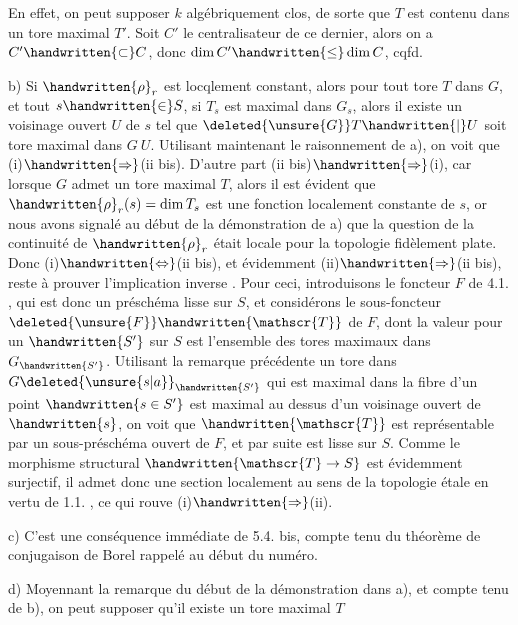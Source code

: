 En effet, on peut supposer $k$ algébriquement clos, de sorte que $T$ est contenu dans un tore maximal  $T'$. Soit $C'$ le centralisateur de ce dernier, alors on a $C'\handwritten{\subset}C$, donc $\dim C'\handwritten{\leq}\dim C$, cqfd.

b)  Si $\handwritten{\rho}_{r}$ est locqlement constant, alors pour tout tore $T$ dans $G$,  et tout $s\handwritten{\in}S$, si $T_{s}$ est  maximal dans $G_{s}$, alors il existe un voisinage ouvert $U$ de $s$ tel que $\deleted{\unsure{G}}T\handwritten{\vert}U$ soit tore maximal dans $G\ U$. Utilisant maintenant le raisonnement de a), on voit que  (i)$\handwritten{\Rightarrow}$(ii bis). D'autre part (ii bis)$\handwritten{\Rightarrow}$(i),
car  lorsque $G$ admet un tore maximal $T$, alors il est évident que $\handwritten{\rho}_{r}(s)=\dim T_{s}$ est une fonction localement constante de  $s$, or nous avons signalé au début de la démonstration de a) que la question de la continuité de $\handwritten{\rho}_{r}$ était locale pour la topologie fidèlement plate. Donc (i)$\handwritten{\Leftrightarrow}$(ii bis), et évidemment (ii)$\handwritten{\Rightarrow}$(ii bis), reste à prouver l'implication inverse .
Pour ceci, introduisons le foncteur $F$ de 4.1. , qui est donc un préschéma  lisse  sur $S$, et considérons le sous-foncteur $\deleted{\unsure{F}}\handwritten{\mathscr{T}}$ de $F$, dont la valeur  pour un $\handwritten{S'}$ sur $S$ est l'ensemble des tores maximaux dans $G_{\handwritten{S'}}$. Utilisant la remarque précédente   un tore dans ${G\deleted{\unsure{s|a}}}_{\handwritten{S'}}$ qui est maximal dans la fibre d'un
point $\handwritten{s\in S'}$ est maximal au dessus d'un voisinage ouvert de $\handwritten{s}$, on voit que $\handwritten{\mathscr{T}}$ est représentable par un sous-préschéma ouvert de $F$, et par suite est lisse  sur $S$. Comme le morphisme structural $\handwritten{\mathscr{T}\to S}$ est évidem\deleted{\unsure{-}}ment surjectif, il admet donc  une section localement au sens de la topologie étale en vertu de 1.1. , ce qui rouve (i)$\handwritten{\Rightarrow}$(ii).

c) C'est une conséquence immédiate de 5.4. bis, compte tenu du théorème de conjugaison de Borel rappelé au début du numéro.

d) Moyennant la remarque du début de la démonstration dans a), et compte tenu de b), on peut supposer qu'il existe un tore maximal $T$
